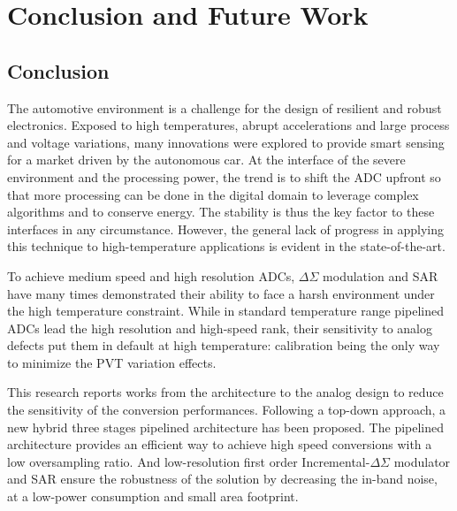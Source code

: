 \chapter{Conclusion and Future Work}
\label{sec:perspectives}
\ifpdf
    \graphicspath{{Chapter6/Figs/Raster/}{Chapter6/Figs/PDF/}{Chapter6/Figs/}}
\else
    \graphicspath{{Chapter6/Figs/Vector/}{Chapter6/Figs/}}
\fi 

\section{Conclusion}           %
The automotive environment is a challenge for the design of resilient and robust electronics. Exposed to high temperatures, abrupt accelerations and large process and voltage variations, many innovations were explored to provide smart sensing for a market driven by the autonomous car. At the interface of the severe environment and the processing power, the trend is to shift the ADC upfront so that more processing can be done in the digital domain to leverage complex algorithms and to conserve energy. The stability is thus the key factor to these interfaces in any circumstance. However, the general lack of progress in applying this technique to high-temperature applications is evident in the state-of-the-art.

To achieve medium speed and high resolution ADCs, \(\Delta \Sigma \) modulation and SAR have many times demonstrated their ability to face a harsh environment under the high temperature constraint. While in standard temperature range pipelined ADCs lead the high resolution and high-speed rank, their sensitivity to analog defects put them in default at high temperature: calibration being the only way to minimize the PVT variation effects.

This research reports works from the architecture to the analog design to reduce the sensitivity of the conversion performances. Following a top-down approach, a new hybrid three stages pipelined architecture has been proposed. The pipelined architecture provides an efficient way to achieve high speed conversions with a low oversampling ratio. And low-resolution first order Incremental-\(\Delta \Sigma \) modulator and SAR ensure the robustness of the solution by decreasing the in-band noise, at a low-power consumption and small area footprint. 


